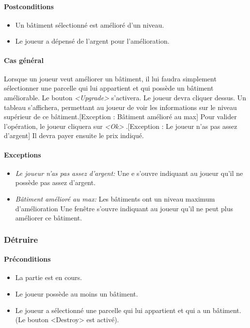 \documentclass[a4paper,11pt]{report}
\begin{document}
\paragraph{Postconditions}
\begin{itemize}
 \item Un bâtiment sélectionné est amélioré d'un niveau.
 \item Le joueur a dépensé de l'argent pour l'amélioration.
\end{itemize}
\paragraph{Cas général}
Lorsque un joueur veut améliorer un bâtiment, il lui faudra simplement sélectionner une parcelle qui lui appartient et qui possède un bâtiment améliorable. Le bouton \og \textit{<Upgrade>} \fg s'activera. Le joueur devra cliquer dessus. Un tableau s'affichera, permettant au joueur de voir les informations sur le niveau supérieur de ce bâtiment.[Exception : Bâtiment amélioré au max] Pour valider l'opération, le joueur cliquera sur \og \textit{<Ok>} \fg.[Exception : Le joueur n'as pas assez d'argent] Il devra payer ensuite le prix indiqué.
\paragraph{Exceptions}
\begin{itemize}
 \item \textit{Le joueur n'as pas assez d'argent:}  Une e s'ouvre indiquant au joueur qu'il ne possède pas assez d'argent.
 \item \textit{Bâtiment amélioré au max:}  Les bâtiments ont un niveau maximum d'amélioration Une fenêtre s'ouvre indiquant au joueur qu'il ne peut plus améliorer ce bâtiment.
\end{itemize}
\subsubsection{Détruire}
\paragraph{Préconditions}
\begin{itemize}
 \item La partie est en cours.
 \item Le joueur possède au moins un bâtiment.
 \item Le joueur a sélectionné une parcelle qui lui appartient et qui a un bâtiment. (Le bouton <Destroy> est activé).
\end{itemize}
\end{document}
